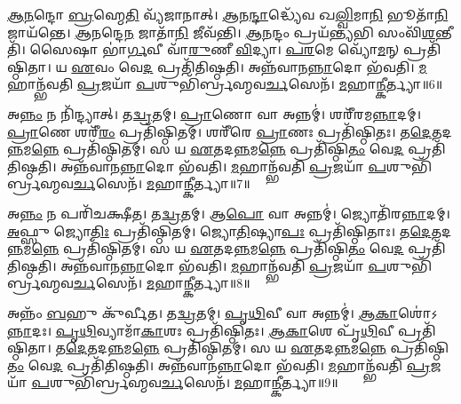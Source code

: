 \-\ul{𑌆}\-\-\ul{𑌨}\-𑌨𑍍𑌦𑍋 \ul{𑌬𑍍𑌰}\-𑌹𑍍𑌮𑍇\-\ul{𑌤𑌿} 𑌵𑍍𑌯᳴𑌜𑌾𑌨𑌾𑌤𑍍। 
\-\ul{𑌆}\-𑌨\-\ul{𑌨𑍍𑌦𑌾}\-𑌦𑍍𑌧𑍍𑌯𑍇᳴𑌵 𑌖\-\ul{𑌲𑍍𑌵𑌿}\-𑌮𑌾\-\ul{𑌨𑌿} 𑌭𑍂𑌤𑌾᳴\-\ul{𑌨𑌿} 𑌜𑌾𑌯᳴𑌨𑍍𑌤𑍇। 
\-\ul{𑌆}\-\-\ul{𑌨}\-𑌨𑍍𑌦𑍇\-\ul{𑌨} 𑌜𑌾𑌤𑌾᳴\-\ul{𑌨𑌿} 𑌜𑍀𑌵᳴𑌨𑍍𑌤𑌿। 
\-\ul{𑌆}\-\-\ul{𑌨}\-𑌨𑍍𑌦𑌂 𑌪𑍍𑌰𑌯᳴\-\ul{𑌨𑍍𑌤𑍍𑌯}\-𑌭𑌿 𑌸𑌂𑌵𑌿᳴\-\ul{𑌶}\-𑌨𑍍𑌤𑍀𑌤𑌿᳴। 
𑌸𑍈𑌷𑌾 𑌭𑌾॑\-\ul{𑌰𑍍𑌗}\-𑌵𑍀 𑌵𑌾᳴\-\ul{𑌰𑍁}\-𑌣𑍀 \ul{𑌵𑌿}\-𑌦𑍍𑌯𑌾। 
\-\ul{𑌪}\-\-\ul{𑌰}\-𑌮𑍇 𑌵𑍍𑌯𑍋᳴\-\ul{𑌮}\-𑌨𑍍 𑌪𑍍𑌰𑌤𑌿᳴\-𑌷𑍍𑌠𑌿𑌤𑌾। 
𑌯 \ul{𑌏}\-𑌵𑌂 𑌵𑍇\-\ul{𑌦} 𑌪𑍍𑌰𑌤𑌿᳴\-𑌤𑌿𑌷𑍍𑌠𑌤𑌿। 
𑌅𑌨𑍍𑌨᳴𑌵𑌾𑌨\-\ul{𑌨𑍍𑌨𑌾}\-𑌦𑍋 𑌭᳴𑌵𑌤𑌿। 
\-\ul{𑌮}\-𑌹𑌾𑌨𑍍𑌭᳴𑌵𑌤𑌿 \ul{𑌪𑍍𑌰}\-𑌜𑌯𑌾᳴ \ul{𑌪}\-𑌶𑍁𑌭𑌿᳴𑌰𑍍𑌬𑍍𑌰𑌹𑍍𑌮𑌵\-\ul{𑌰𑍍𑌚}\-𑌸𑍇𑌨᳴। 
\-\ul{𑌮}\-𑌹𑌾\-\ul{𑌨𑍍𑌕𑍀}\-𑌰𑍍𑌤𑍍𑌯𑌾॥6॥

𑌅\-\ul{𑌨𑍍𑌨𑌂} 𑌨 𑌨𑌿᳴𑌨𑍍𑌦𑍍𑌯𑌾𑌤𑍍। 
𑌤\-\ul{𑌦𑍍𑌵𑍍𑌰}\-𑌤𑌮𑍍। 
\-\ul{𑌪𑍍𑌰𑌾}\-𑌣𑍋 𑌵𑌾 𑌅𑌨𑍍𑌨𑌮𑍍॑। 
𑌶𑌰𑍀᳴𑌰𑌮\-\ul{𑌨𑍍𑌨𑌾}\-𑌦𑌮𑍍। 
\-\ul{𑌪𑍍𑌰𑌾}\-𑌣𑍇 𑌶𑌰𑍀᳴\-\ul{𑌰𑌂} 𑌪𑍍𑌰𑌤𑌿᳴\-𑌷𑍍𑌠𑌿𑌤𑌮𑍍। 
𑌶𑌰𑍀᳴𑌰𑍇 \ul{𑌪𑍍𑌰𑌾}\-𑌣𑌃 𑌪𑍍𑌰𑌤𑌿᳴\-𑌷𑍍𑌠𑌿𑌤𑌃। 
𑌤\-\ul{𑌦𑍇}\-𑌤𑌦\-\ul{𑌨𑍍𑌨}\-𑌮\-\ul{𑌨𑍍𑌨𑍇} 𑌪𑍍𑌰𑌤𑌿᳴\-𑌷𑍍𑌠𑌿𑌤𑌮𑍍। 
𑌸 𑌯 \ul{𑌏}\-𑌤𑌦\-\ul{𑌨𑍍𑌨}\-𑌮\-\ul{𑌨𑍍𑌨𑍇} 𑌪𑍍𑌰𑌤𑌿᳴\-𑌷𑍍𑌠𑌿\-\ul{𑌤𑌂} 𑌵𑍇\-\ul{𑌦} 𑌪𑍍𑌰𑌤𑌿᳴\-𑌤𑌿𑌷𑍍𑌠𑌤𑌿। 
𑌅𑌨𑍍𑌨᳴𑌵𑌾𑌨\-\ul{𑌨𑍍𑌨𑌾}\-𑌦𑍋 𑌭᳴𑌵𑌤𑌿। 
\-\ul{𑌮}\-𑌹𑌾𑌨𑍍𑌭᳴𑌵𑌤𑌿 \ul{𑌪𑍍𑌰}\-𑌜𑌯𑌾᳴ \ul{𑌪}\-𑌶𑍁𑌭𑌿᳴𑌰𑍍𑌬𑍍𑌰𑌹𑍍𑌮𑌵\-\ul{𑌰𑍍𑌚}\-𑌸𑍇𑌨᳴। 
\-\ul{𑌮}\-𑌹𑌾\-\ul{𑌨𑍍𑌕𑍀}\-𑌰𑍍𑌤𑍍𑌯𑌾॥7॥

𑌅\-\ul{𑌨𑍍𑌨𑌂} 𑌨 𑌪𑌰𑌿᳴𑌚𑌕𑍍𑌷𑍀𑌤। 
𑌤\-\ul{𑌦𑍍𑌵𑍍𑌰}\-𑌤𑌮𑍍। 
𑌆\-\ul{𑌪𑍋} 𑌵𑌾 𑌅𑌨𑍍𑌨𑌮𑍍॑। 
𑌜𑍍𑌯𑍋𑌤𑌿᳴𑌰\-\ul{𑌨𑍍𑌨𑌾}\-𑌦𑌮𑍍। 
\-\ul{𑌅}\-𑌫𑍍𑌸𑍁 𑌜𑍍𑌯𑍋\-\ul{𑌤𑌿𑌃} 𑌪𑍍𑌰𑌤𑌿᳴\-𑌷𑍍𑌠𑌿𑌤𑌮𑍍। 
𑌜𑍍𑌯𑍋\-\ul{𑌤𑌿}\-𑌷𑍍𑌯𑌾\-\ul{𑌪𑌃} 𑌪𑍍𑌰𑌤𑌿᳴\-𑌷𑍍𑌠𑌿𑌤𑌾𑌃। 
𑌤\-\ul{𑌦𑍇}\-𑌤𑌦\-\ul{𑌨𑍍𑌨}\-𑌮\-\ul{𑌨𑍍𑌨𑍇} 𑌪𑍍𑌰𑌤𑌿᳴\-𑌷𑍍𑌠𑌿𑌤𑌮𑍍। 
𑌸 𑌯 \ul{𑌏}\-𑌤𑌦\-\ul{𑌨𑍍𑌨}\-𑌮\-\ul{𑌨𑍍𑌨𑍇} 𑌪𑍍𑌰𑌤𑌿᳴\-𑌷𑍍𑌠𑌿\-\ul{𑌤𑌂} 𑌵𑍇\-\ul{𑌦} 𑌪𑍍𑌰𑌤𑌿᳴\-𑌤𑌿𑌷𑍍𑌠𑌤𑌿। 
𑌅𑌨𑍍𑌨᳴𑌵𑌾𑌨\-\ul{𑌨𑍍𑌨𑌾}\-𑌦𑍋 𑌭᳴𑌵𑌤𑌿। 
\-\ul{𑌮}\-𑌹𑌾𑌨𑍍𑌭᳴𑌵𑌤𑌿 \ul{𑌪𑍍𑌰}\-𑌜𑌯𑌾᳴ \ul{𑌪}\-𑌶𑍁𑌭𑌿᳴𑌰𑍍𑌬𑍍𑌰𑌹𑍍𑌮𑌵\-\ul{𑌰𑍍𑌚}\-𑌸𑍇𑌨᳴। 
\-\ul{𑌮}\-𑌹𑌾\-\ul{𑌨𑍍𑌕𑍀}\-𑌰𑍍𑌤𑍍𑌯𑌾॥8॥

𑌅𑌨𑍍𑌨𑌂᳴ \ul{𑌬}\-𑌹𑍁 𑌕𑍁᳴𑌰𑍍𑌵𑍀𑌤। 
𑌤\-\ul{𑌦𑍍𑌵𑍍𑌰}\-𑌤𑌮𑍍। 
\-\ul{𑌪𑍃}\-\-\ul{𑌥𑌿}\-𑌵𑍀 𑌵𑌾 𑌅𑌨𑍍𑌨𑌮𑍍॑। 
\-\ul{𑌆}\-\-\ul{𑌕𑌾}\-𑌶𑍋॑𑌽\-\ul{𑌨𑍍𑌨𑌾}\-𑌦𑌃। 
\-\ul{𑌪𑍃}\-\-\ul{𑌥𑌿}\-𑌵𑍍𑌯𑌾𑌮𑌾᳴\-\ul{𑌕𑌾}\-𑌶𑌃 𑌪𑍍𑌰𑌤𑌿᳴\-𑌷𑍍𑌠𑌿𑌤𑌃। 
\-\ul{𑌆}\-\-\ul{𑌕𑌾}\-𑌶𑍇 𑌪𑍃᳴\-\ul{𑌥𑌿}\-𑌵𑍀 𑌪𑍍𑌰𑌤𑌿᳴\-𑌷𑍍𑌠𑌿𑌤𑌾। 
𑌤\-\ul{𑌦𑍇}\-𑌤𑌦\-\ul{𑌨𑍍𑌨}\-𑌮\-\ul{𑌨𑍍𑌨𑍇} 𑌪𑍍𑌰𑌤𑌿᳴\-𑌷𑍍𑌠𑌿𑌤𑌮𑍍। 
𑌸 𑌯 \ul{𑌏}\-𑌤𑌦\-\ul{𑌨𑍍𑌨}\-𑌮\-\ul{𑌨𑍍𑌨𑍇} 𑌪𑍍𑌰𑌤𑌿᳴\-𑌷𑍍𑌠𑌿\-\ul{𑌤𑌂} 𑌵𑍇\-\ul{𑌦} 𑌪𑍍𑌰𑌤𑌿᳴\-𑌤𑌿𑌷𑍍𑌠𑌤𑌿। 
𑌅𑌨𑍍𑌨᳴𑌵𑌾𑌨\-\ul{𑌨𑍍𑌨𑌾}\-𑌦𑍋 𑌭᳴𑌵𑌤𑌿। 
\-\ul{𑌮}\-𑌹𑌾𑌨𑍍𑌭᳴𑌵𑌤𑌿 \ul{𑌪𑍍𑌰}\-𑌜𑌯𑌾᳴ \ul{𑌪}\-𑌶𑍁𑌭𑌿᳴𑌰𑍍𑌬𑍍𑌰𑌹𑍍𑌮𑌵\-\ul{𑌰𑍍𑌚}\-𑌸𑍇𑌨᳴। 
\-\ul{𑌮}\-𑌹𑌾\-\ul{𑌨𑍍𑌕𑍀}\-𑌰𑍍𑌤𑍍𑌯𑌾॥9॥

